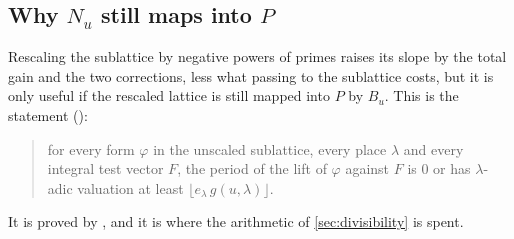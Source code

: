 \subsection{Why $N_u$ still maps into $P$}\label{sec:adm}
Rescaling the sublattice by negative powers of primes raises its slope by the total gain and
the two corrections, less what passing to the sublattice costs, but it is only useful if the
rescaled lattice is still
mapped into $P$ by $B_u$. This is the statement
\lvS{} ():
\begin{quote}
for every form $\varphi$ in the unscaled sublattice, every place $\lambda$ and every integral test
vector $F$, the period of the lift of $\varphi$ against $F$ is $0$ or has $\lambda$-adic valuation at
least $\lfloor e_\lambda\,g(u,\lambda)\rfloor$.
\end{quote}
It is proved by , and it is where the arithmetic of
\cref{sec:divisibility} is spent.

